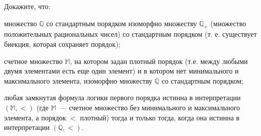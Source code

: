 Докажите, что:
\begin{enumcyr}
    \item множество $\mathbb{Q}$ со стандартным порядком изоморфно множеству $\mathbb{Q}_{+}$ (множество положительных
    	рациональных чисел) со стандартным порядком (т. е. существует биекция, которая сохраняет порядок);
    \item счетное множество $\mathbb{M}$, на котором задан плотный порядок (т.е. между любыми двумя элементами есть еще один
	    элемент) и в котором нет минимального и максимального элемента, изоморфно множеству $\mathbb{Q}$ со стандартным
        порядком;
    \item любая замкнутая формула логики первого порядка истинна в интерпретации $(\mathbb{M}, <)$ (где $\mathbb{M}$~---
	    счетное множество без минимального и максимального элемента, а порядок $<$ плотный) тогда и только тогда, когда она
    	истинна в интерпретации $(\mathbb{Q}, <)$. 
\end{enumcyr}